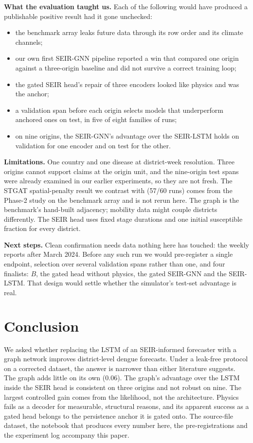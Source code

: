 \textbf{What the evaluation taught us.} Each of the following would have
produced a publishable positive result had it gone unchecked:
\begin{itemize}\itemsep1pt
\item the benchmark array leaks future data through its row order and its
      climate channels;
\item our own first SEIR-GNN pipeline reported a win that compared one origin
      against a three-origin baseline and did not survive a correct training
      loop;
\item the gated SEIR head's repair of three encoders looked like physics and
      was the anchor;
\item a validation span before each origin selects models that underperform
      anchored ones on test, in five of eight families of runs;
\item on nine origins, the SEIR-GNN's advantage over the SEIR-LSTM holds on
      validation for one encoder and on test for the other.
\end{itemize}

\textbf{Limitations.} One country and one disease at district-week resolution.
Three origins cannot support claims at the origin unit, and the nine-origin
test spans were already examined in our earlier experiments, so they are not
fresh. The STGAT spatial-penalty result we contrast with (57/60 runs) comes from
the Phase-2 study on the benchmark array and is not rerun here. The graph is the benchmark's hand-built
adjacency; mobility data might couple districts differently. The SEIR head uses
fixed stage durations and one initial susceptible fraction for every district.

\textbf{Next steps.} Clean confirmation needs data nothing here has touched: the
weekly reports after March 2024. Before any such run we would pre-register a
single endpoint, selection over several validation spans rather than one, and
four finalists: $B$, the gated head without physics, the gated SEIR-GNN and the
SEIR-LSTM. That design would settle whether the simulator's test-set advantage
is real.

\section{Conclusion}
We asked whether replacing the LSTM of an SEIR-informed forecaster with a graph
network improves district-level dengue forecasts. Under a leak-free protocol on
a corrected dataset, the answer is narrower than either literature suggests. The
graph adds little on its own (0.06). The graph's advantage over the LSTM inside
the SEIR head is consistent on three origins and not robust on nine. The largest
controlled gain comes from the likelihood, not the architecture. Physics fails
as a decoder for measurable, structural reasons, and its apparent success as a
gated head belongs to the persistence anchor it is gated onto. The source-file
dataset, the notebook that produces every number here, the pre-registrations and
the experiment log accompany this paper.
